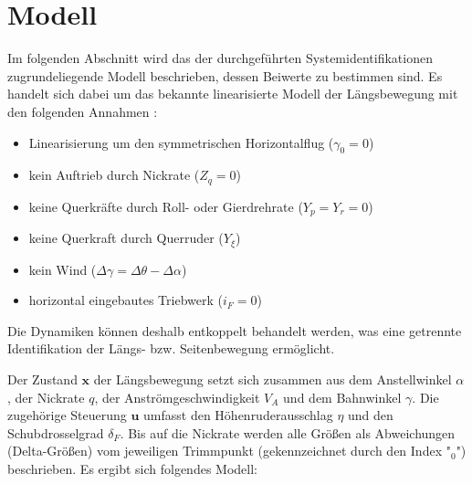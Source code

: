 \chapter{Modell} \label{chapter:Modell}
Im folgenden Abschnitt wird das der durchgeführten Systemidentifikationen zugrundeliegende Modell beschrieben, dessen 
Beiwerte zu bestimmen sind. Es handelt sich dabei um das bekannte linearisierte Modell der Längsbewegung mit 
den folgenden Annahmen \cite{Fichter2009}:

\begin{itemize}
	\item Linearisierung um den symmetrischen Horizontalflug ($ \gamma_0=0 $)
	\item kein Auftrieb durch Nickrate ($ Z_q=0 $)
	\item keine Querkräfte durch Roll- oder Gierdrehrate ($ Y_p=Y_r=0 $)
	\item keine Querkraft durch Querruder ($ Y_\xi $)
	\item kein Wind ($ \Delta\gamma = \Delta\theta-\Delta\alpha $)
	\item horizontal eingebautes Triebwerk ($ i_F=0 $)
\end{itemize} 

Die Dynamiken können deshalb entkoppelt behandelt werden, was eine getrennte Identifikation der Längs- bzw. Seitenbewegung 
ermöglicht. %

Der Zustand $ \mathbf {x} $ der Längsbewegung setzt sich zusammen aus dem Anstellwinkel $ \alpha $, der Nickrate $ q $, der 
Anströmgeschwindigkeit $ V_A $ und dem Bahnwinkel $ \gamma $. Die zugehörige Steuerung $ \mathbf{u} $ umfasst den 
Höhenruderausschlag $ \eta $ und den Schubdrosselgrad $ \delta_F $. Bis auf die Nickrate werden alle Größen als Abweichungen 
(Delta-Größen) vom jeweiligen Trimmpunkt (gekennzeichnet durch den Index "$ _0 $") beschrieben. Es ergibt sich folgendes 
Modell:

